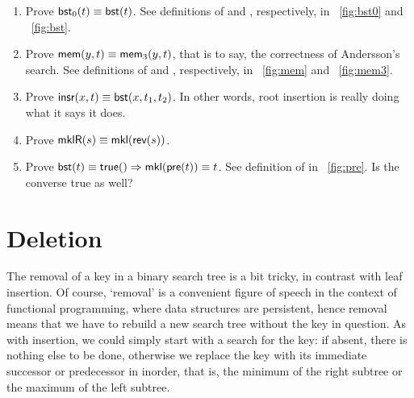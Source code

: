 \begin{enumerate}

  \item Prove \(\textsf{bst}_0(t) \equiv \textsf{bst}(t)\). See definitions of
   and
  , respectively, in
  \fig~\vref{fig:bst0} and \fig~\vref{fig:bst}.

  \item Prove \(\textsf{mem}(y,t) \equiv \textsf{mem}_3(y,t)\), that is to
  say, the correctness of Andersson's search. See definitions of
   and
  , respectively, in
  \fig~\vref{fig:mem} and \fig~\vref{fig:mem3}.

  \item Prove \(\textsf{insr}(x,t) \equiv \textsf{bst}(x,t_1,t_2)\).
   In
    other words, root insertion is really doing what it says it does.

  \item Prove \(\textsf{mklR}(s) \equiv \textsf{mkl}(\textsf{rev}(s))\).
     

  \item Prove \(\textsf{bst}(t) \equiv \textsf{true}() \Rightarrow
    \textsf{mkl}(\textsf{pre}(t)) \equiv t\). See definition of 
     in \fig~\vref{fig:pre}. Is the converse
    true as well?

\end{enumerate}

\section{Deletion}

The removal of a key in a binary search tree is a bit tricky, in
contrast with leaf insertion. Of course, `removal' is a convenient
figure of speech in the context of functional programming, where data
structures are persistent, hence removal means that we have to rebuild
a new search tree without the key in question. As with insertion, we
could simply start with a search for the key: if absent, there is
nothing else to be done, otherwise we replace the key with its
immediate successor or predecessor in inorder, that is, the minimum of
the right subtree or the maximum of the left subtree. 

